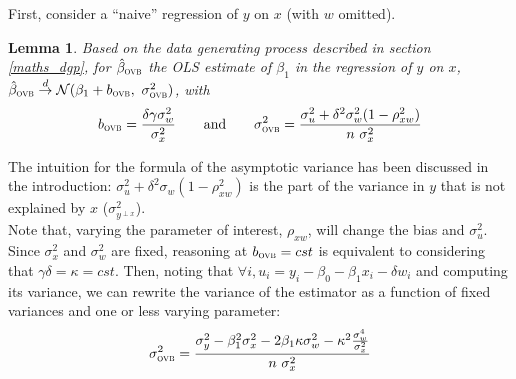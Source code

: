 \documentclass[usletter, 12pt]{article}
\newtheorem{lemma}{Lemma}
\begin{document}
				First, consider a ``naive'' regression of $y$ on $x$ (with $w$ omitted). 
%				
						
				\begin{lemma}\label{lemma_ovb}
					Based on the data generating process described in section \ref{maths_dgp}, for $\hat{\beta}_{\textsc{ovb}}$ the OLS estimate of $\beta_{1}$ in the regression of $y$ on $x$, $\hat{\beta}_{\textsc{ovb}} \overset{d}{\to} \mathcal{N}(\beta_{1} + b_{\textsc{ovb}} , \ \sigma_{\textsc{ovb}}^{2})$, with
					\[
						b_{\textsc{ovb}} = \dfrac{\delta \gamma \sigma_{w}^{2}}{\sigma_{x}^{2}} 
						\qquad \text{and} \qquad
						\sigma_{\textsc{ovb}}^{2} = \dfrac{\sigma_{u}^{2} + \delta^{2} \sigma_{w}^{2}(1 - \rho_{xw}^{2})}{n \ \sigma_{x}^{2}}
					\]
				\end{lemma}
				
			The intuition for the formula of the asymptotic variance has been discussed in the introduction: $\sigma_{u}^{2} + \delta^{2} \sigma_{w}(1 - \rho_{xw}^{2})$ is the part of the variance in $y$ that is not explained by $x$ ($\sigma^{2}_{y^{\perp x}}$).\\
			
			Note that, varying the parameter of interest, $\rho_{xw}$, will change the bias and $\sigma_{u}^{2}$. Since $\sigma_{x}^{2}$ and $\sigma_{w}^{2}$ are fixed, reasoning at $b_{\textsc{ovb}} = cst$ is equivalent to considering that $\gamma \delta = \kappa = cst$. Then, noting that $\forall i, u_{i} = y_i - \beta_{0} - \beta_{1}x_{i} - \delta w_{i}$ and computing its variance, we can rewrite the variance of the estimator as a function of fixed variances and one or less varying parameter:
			~
			\[
				\sigma_{\textsc{ovb}}^{2} = \dfrac{\sigma_{y}^{2} - \beta_{1}^{2}\sigma_{x}^{2} - 2\beta_{1}\kappa\sigma_{w}^{2} - \kappa^{2}\frac{\sigma_{w}^{4}}{\sigma_{x}^{2}}}{n \ \sigma_{x}^{2}}
			\]
			
\end{document}
